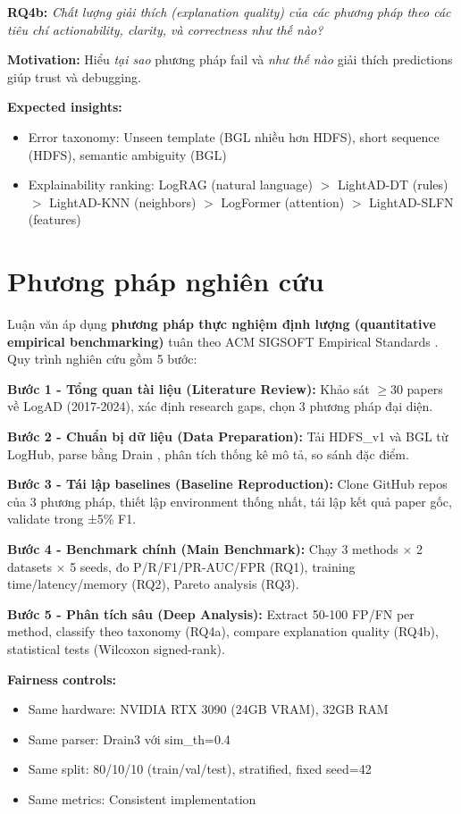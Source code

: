 \textbf{RQ4b:} \textit{Chất lượng giải thích (explanation quality) của các phương pháp theo các tiêu chí actionability, clarity, và correctness như thế nào?}

\textbf{Motivation:} Hiểu \textit{tại sao} phương pháp fail và \textit{như thế nào} giải thích predictions giúp trust và debugging.

\textbf{Expected insights:}
\begin{itemize}
    \item Error taxonomy: Unseen template (BGL nhiều hơn HDFS), short sequence (HDFS), semantic ambiguity (BGL)
    \item Explainability ranking: LogRAG (natural language) $>$ LightAD-DT (rules) $>$ LightAD-KNN (neighbors) $>$ LogFormer (attention) $>$ LightAD-SLFN (features)
\end{itemize}

\section{Phương pháp nghiên cứu}
\label{sec:methodology-overview}

Luận văn áp dụng \textbf{phương pháp thực nghiệm định lượng (quantitative empirical benchmarking)} tuân theo ACM SIGSOFT Empirical Standards \cite{acmsigsoft2022standards}. Quy trình nghiên cứu gồm 5 bước:

\textbf{Bước 1 - Tổng quan tài liệu (Literature Review):} Khảo sát $\geq$30 papers về LogAD (2017-2024), xác định research gaps, chọn 3 phương pháp đại diện.

\textbf{Bước 2 - Chuẩn bị dữ liệu (Data Preparation):} Tải HDFS\_v1 và BGL từ LogHub, parse bằng Drain \cite{he2017drain}, phân tích thống kê mô tả, so sánh đặc điểm.

\textbf{Bước 3 - Tái lập baselines (Baseline Reproduction):} Clone GitHub repos của 3 phương pháp, thiết lập environment thống nhất, tái lập kết quả paper gốc, validate trong ±5\% F1.

\textbf{Bước 4 - Benchmark chính (Main Benchmark):} Chạy 3 methods $\times$ 2 datasets $\times$ 5 seeds, đo P/R/F1/PR-AUC/FPR (RQ1), training time/latency/memory (RQ2), Pareto analysis (RQ3).

\textbf{Bước 5 - Phân tích sâu (Deep Analysis):} Extract 50-100 FP/FN per method, classify theo taxonomy (RQ4a), compare explanation quality (RQ4b), statistical tests (Wilcoxon signed-rank).

\textbf{Fairness controls:}
\begin{itemize}
    \item Same hardware: NVIDIA RTX 3090 (24GB VRAM), 32GB RAM
    \item Same parser: Drain3 với sim\_th=0.4
    \item Same split: 80/10/10 (train/val/test), stratified, fixed seed=42
    \item Same metrics: Consistent implementation
\end{itemize}

